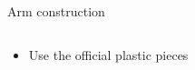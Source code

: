 \documentclass{beamer}
\begin{document}

\begin{frame}{Arm construction}

    \begin{columns}
        \begin{column}[]{0.5\textwidth}
            \begin{itemize}
                \item Use the official plastic pieces
            \end{itemize}
        \end{column}
        
        
        \begin{column}[]{0.5\textwidth}
        \end{column}
    \end{columns}
    
\end{frame}



























\end{document}
